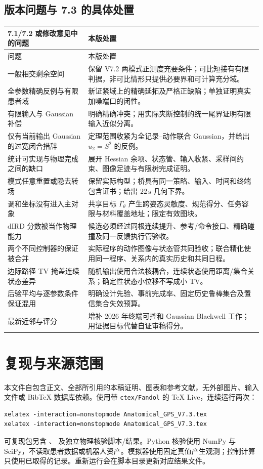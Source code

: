 \documentclass[UTF8,fontset=fandol,zihao=5,a4paper]{ctexart}
\theoremstyle{definition}
\theoremstyle{remark}\newtheorem{remark}[theorem]{说明}
\numberwithin{equation}{section}
\begin{document}
\subsection{版本问题与 7.3 的具体处置}
\begin{longtable}{p{.29\linewidth}p{.62\linewidth}}
\toprule 7.1/7.2 或修改意见中的问题 & 本版处置\\\midrule\endfirsthead
\toprule 问题 & 本版处置\\\midrule\endhead
一般相交剩余空间 & 保留 V7.2 两模式正测度充要条件；可比短接有有限判据，非可比情形只提供必要界和可计算充分域。\\
全参数精确反例与有限患者域 & 新证紧域上的精确延拓及严格正缺陷；单独证明真实加噪端口的闭性。\\
有限输入与 Gaussian 补偿 & 明确精确冲突；用实际夹断控制的统一尾界证明有限输入近似分离。\\
仅有当前输出 Gaussian 的过宽闭合措辞 & 定理范围收紧为全记录--动作联合 Gaussian，并给出 $u_2=S^2$ 的反例。\\
统计可实现与物理完成之间的缺口 & 展开 Hessian 余项、状态管、输入收紧、采样间约束、图像足迹与有限树完成证明。\\
模式任意重置或隐去转场 & 保留实际构型；桥具有同一策略、输入、时间和终端包含证书；给出 $22\,\mathrm s$ 几何下界。\\
调和坐标没有进入主对象 & 共享目标 $\Gamma_\theta$ 产生跨姿态灵敏度、规范得分、任务容限与材料覆盖地址；限定有效图块。\\
dIRD 分数被当作物理能力 & 候选必须经过同根连续提升、参考/命令接口、精确碰撞及同一反馈执行管验收。\\
两个不同控制器的保证被合并 & 实际程序的动作图像与状态管共同验收；联合精化使用同一程序、关系内的真实历史和共同日程。\\
边际路径 TV 掩盖连续状态差异 & 随机输出使用合法核耦合，连续状态使用距离/集合关系；确定性状态小位移不写成小 TV。\\
后验平均与逐参数条件保证混用 & 明确设计先验、事前完成率、固定历史鲁棒集合及置信集合失效预算。\\
最新近邻与评分 & 增补 2026 年终端可控和 Gaussian Blackwell 工作；用证据目标代替自证审稿得分。\\
\bottomrule
\end{longtable}

\section{复现与来源范围}
\label{app:repro73}
本文件自包含正文、全部所引用的本稿证明、图表和参考文献，无外部图片、输入文件或 BibTeX 数据库依赖。使用带 \texttt{ctex/Fandol} 的 TeX Live，连续运行两次：
\begin{verbatim}
xelatex -interaction=nonstopmode Anatomical_GPS_V7.3.tex
xelatex -interaction=nonstopmode Anatomical_GPS_V7.3.tex
\end{verbatim}
可复现包另含 、 及独立物理核验脚本/结果。Python 核验使用 NumPy 与 SciPy，不读取患者数据或机器人资产。模拟器使用固定真值产生观测；控制计算只使用已取得的记录。重新运行会在脚本目录更新对应结果文件。
\end{document}

